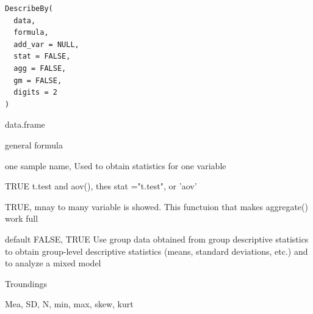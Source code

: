 \documentclass[a4paper]{book}
\begin{document}
%
\begin{Usage}
\begin{verbatim}
DescribeBy(
  data,
  formula,
  add_var = NULL,
  stat = FALSE,
  agg = FALSE,
  gm = FALSE,
  digits = 2
)
\end{verbatim}
\end{Usage}
%
\begin{Arguments}
\begin{ldescription}
\item[\code{data}] data.frame

\item[\code{formula}] general formula

\item[\code{add\_var}] one sample name, Used to obtain statistics for one variable

\item[\code{stat}] TRUE t.test and aov(), thes stat ="t.test", or 'aov'

\item[\code{agg}] TRUE, mnay to many variable is showed. This functuion that makes aggregate() work full

\item[\code{gm}] default FALSE, TRUE Use group data obtained from group descriptive statistics to obtain group-level descriptive statistics (means, standard deviations, etc.) and to analyze a mixed model

\item[\code{digits}] Troundings
\end{ldescription}
\end{Arguments}
%
\begin{Value}
Mea, SD, N, min, max, skew, kurt
\end{Value}
%
\end{document}
